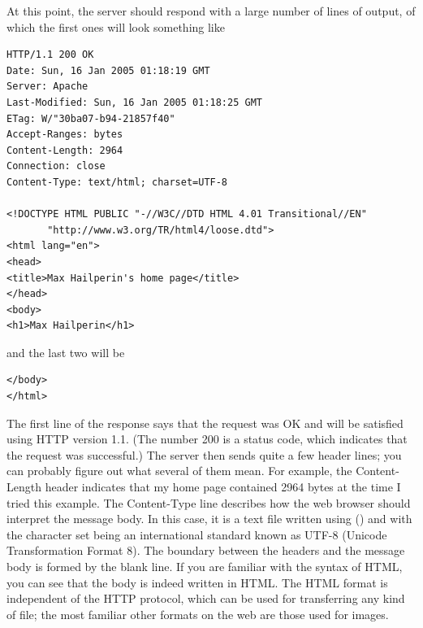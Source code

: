 At this point, the server should respond with a large number of lines
of output, of which the first ones will look something like
\begin{verbatim}
HTTP/1.1 200 OK
Date: Sun, 16 Jan 2005 01:18:19 GMT
Server: Apache
Last-Modified: Sun, 16 Jan 2005 01:18:25 GMT
ETag: W/"30ba07-b94-21857f40"
Accept-Ranges: bytes
Content-Length: 2964
Connection: close
Content-Type: text/html; charset=UTF-8

<!DOCTYPE HTML PUBLIC "-//W3C//DTD HTML 4.01 Transitional//EN"
       "http://www.w3.org/TR/html4/loose.dtd">
<html lang="en">
<head>
<title>Max Hailperin's home page</title>
</head>
<body>
<h1>Max Hailperin</h1>
\end{verbatim}
and the last two will be
\begin{verbatim}
</body>
</html>
\end{verbatim}

The first line of the response says that the request was OK and will be
satisfied using HTTP version 1.1.  (The number 200 is a status code,
which indicates that the request was successful.) The server then sends
quite a few header lines; you can probably figure out what several of
them mean.  For example, the Content-Length header indicates that my
home page contained 2964 bytes at the time I tried this example.  The
Content-Type line describes how the web browser should interpret the
message body. In this case, it is a text file written using
 () and with the
character set being an international standard known as UTF-8 (Unicode
Transformation Format 8).   The
boundary between the headers and the message body is formed by the
blank line.  If you are familiar with the syntax of HTML, you can see
that the body is indeed written in HTML.  The HTML format is independent
of the HTTP protocol, which can be used for transferring any kind of
file; the most familiar other formats on the web are those used for
images.

